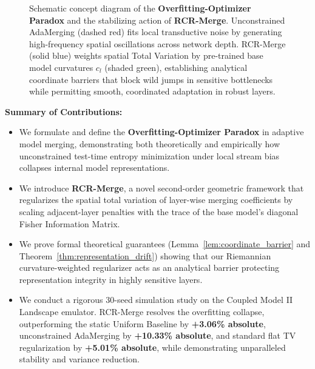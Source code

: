 \begin{figure}[t]
  \caption{Schematic concept diagram of the \textbf{Overfitting-Optimizer Paradox} and the stabilizing action of \textbf{RCR-Merge}. Unconstrained AdaMerging (dashed red) fits local transductive noise by generating high-frequency spatial oscillations across network depth. RCR-Merge (solid blue) weights spatial Total Variation by pre-trained base model curvatures $c_l$ (shaded green), establishing analytical coordinate barriers that block wild jumps in sensitive bottlenecks while permitting smooth, coordinated adaptation in robust layers.}
  \label{fig:schematic}
\end{figure}

\textbf{Summary of Contributions:}
\begin{itemize}
    \item We formulate and define the \textbf{Overfitting-Optimizer Paradox} in adaptive model merging, demonstrating both theoretically and empirically how unconstrained test-time entropy minimization under local stream bias collapses internal model representations.
    \item We introduce \textbf{RCR-Merge}, a novel second-order geometric framework that regularizes the spatial total variation of layer-wise merging coefficients by scaling adjacent-layer penalties with the trace of the base model's diagonal Fisher Information Matrix.
    \item We prove formal theoretical guarantees (Lemma~\ref{lem:coordinate_barrier} and Theorem~\ref{thm:representation_drift}) showing that our Riemannian curvature-weighted regularizer acts as an analytical barrier protecting representation integrity in highly sensitive layers.
    \item We conduct a rigorous 30-seed simulation study on the Coupled Model II Landscape emulator. RCR-Merge resolves the overfitting collapse, outperforming the static Uniform Baseline by \textbf{+3.06\% absolute}, unconstrained AdaMerging by \textbf{+10.33\% absolute}, and standard flat TV regularization by \textbf{+5.01\% absolute}, while demonstrating unparalleled stability and variance reduction.
\end{itemize}